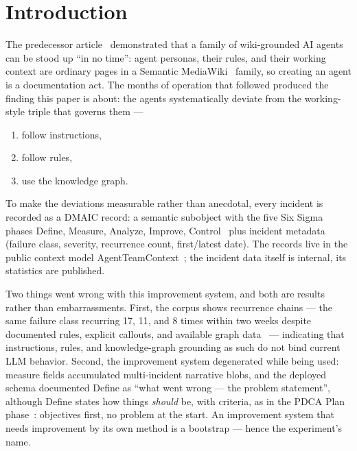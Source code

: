 \documentclass[
]{ceurart}
\begin{document}
\maketitle

\section{Introduction}\label{sec:introduction}
The predecessor article~\cite{fahl2026sixagents} demonstrated that a family
of wiki-grounded AI agents can be stood up ``in no time'': agent personas,
their rules, and their working context are ordinary pages in a Semantic
MediaWiki~\cite{kroetzsch2006smw} family, so creating an agent is a
documentation act. The months of operation that followed produced the
finding this paper is about: the agents systematically deviate from the
working-style triple that governs them ---
\begin{enumerate}
\item follow instructions,
\item follow rules,
\item use the knowledge graph.
\end{enumerate}

To make the deviations measurable rather than anecdotal, every incident is
recorded as a DMAIC record: a semantic subobject with the five Six Sigma
phases Define, Measure, Analyze, Improve,
Control~\cite{demast2012dmaic,deming1986} plus incident metadata (failure
class, severity, recurrence count, first/latest date). The records live in
the public context model AgentTeamContext~\cite{agentteamcontext}; the
incident data itself is internal, its statistics are published.

Two things went wrong with this improvement system, and both are results
rather than embarrassments. First, the corpus shows recurrence chains ---
the same failure class recurring 17, 11, and 8 times within two weeks
despite documented rules, explicit callouts, and available graph
data~\cite{dmaicbootstrap} --- indicating that instructions, rules, and
knowledge-graph grounding as such do not bind current LLM behavior.
Second, the improvement system degenerated while being used: measure
fields accumulated multi-incident narrative blobs, and the deployed schema
documented Define as ``what went wrong --- the problem statement'',
although Define states how things \emph{should} be, with criteria, as in
the PDCA Plan phase~\cite{deming1986}: objectives first, no problem at the
start. An improvement system that needs improvement by its own method is a
bootstrap --- hence the experiment's name.
\end{document}
